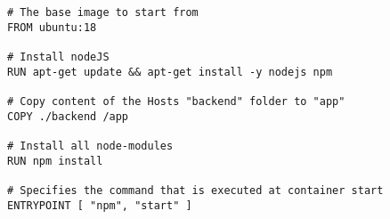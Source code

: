 
\begin{lstlisting}[language=docker, frame=single, caption={Exemplary NodeJS Dockerfile},label=code::docker]
# The base image to start from
FROM ubuntu:18

# Install nodeJS
RUN apt-get update && apt-get install -y nodejs npm

# Copy content of the Hosts "backend" folder to "app"
COPY ./backend /app

# Install all node-modules
RUN npm install

# Specifies the command that is executed at container start
ENTRYPOINT [ "npm", "start" ]

\end{lstlisting}
